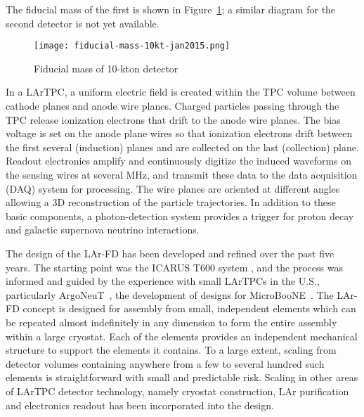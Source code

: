 The fiducial mass of the first is shown in Figure~\ref{fig:10kt-fiducial-mass}; a similar diagram for the second detector is not yet available.
\begin{figure}[htbp]
\centering
\texttt{[image: fiducial-mass-10kt-jan2015.png]}
\caption[Fiducial mass of 10-kton detector]{Fiducial mass of 10-kton detector}
\label{fig:10kt-fiducial-mass}
\end{figure}

In a LArTPC, a uniform electric field is created within the TPC
volume between cathode planes and anode wire planes. Charged particles
passing through the TPC release ionization electrons that drift to the
anode wire planes. The bias voltage is set on the anode plane wires so that ionization electrons drift between the first several (induction) planes and are collected on the last (collection) plane.
Readout electronics amplify and continuously digitize
the induced waveforms on the sensing wires at several MHz, and transmit
these data to the data acquisition (DAQ)  system for processing. The wire planes are oriented at different angles allowing a 3D reconstruction of the particle trajectories. In addition to these basic
components, a photon-detection system provides a trigger for proton
decay and galactic supernova neutrino interactions. 


The design of the LAr-FD has been developed and refined 
over the past five years. The starting point was the ICARUS  T600 system \cite{Icarus-T600}, 
and the process was informed and guided by the experience with small 
LArTPCs in the U.S., particularly ArgoNeuT~\cite{argoneut-url},  the development of designs 
for MicroBooNE~\cite{microboone-url}.
The LAr-FD concept is designed for assembly 
from small, independent elements  which can be repeated almost indefinitely
 in any dimension to form the entire 
assembly within a large cryostat. Each 
of the elements provides an independent mechanical structure 
to support the elements it contains.  To a large extent, scaling from 
detector volumes containing anywhere from a few to 
several hundred such elements is straightforward with small 
and predictable risk. Scaling in other areas of 
LArTPC detector technology, namely cryostat construction, LAr purification
and electronics readout has been incorporated into the design.


